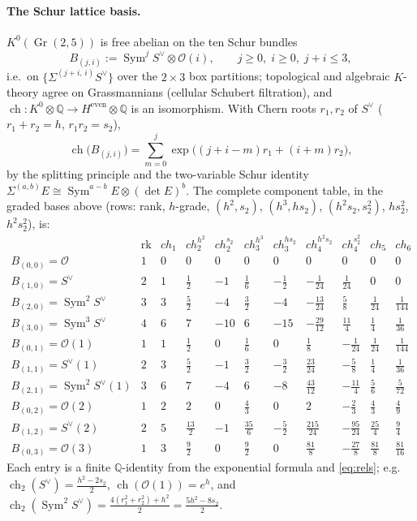\documentclass[11pt]{article}
\theoremstyle{definition}
\newcommand{\ch}{\operatorname{ch}}
\newcommand{\Gr}{\operatorname{Gr}}
\newcommand{\Sym}{\operatorname{Sym}}
\newcommand{\tensor}{\otimes}
\newcommand{\Oo}{\mathcal O}
\begin{document}
\paragraph{The Schur lattice basis.}
$K^0(\Gr(2,5))$ is free abelian on the ten Schur bundles
\[
B_{(j,i)}:=\Sym^j S^\vee\tensor\Oo(i),
\qquad j\ge 0,\; i\ge 0,\; j+i\le 3,
\]
i.e.\ on $\{\Sigma^{(j+i,\,i)}S^\vee\}$ over the $2\times3$ box
partitions; topological and algebraic $K$-theory agree on
Grassmannians (cellular Schubert filtration), and
$\ch:K^0\tensor\mathbb Q\to H^{\mathrm{even}}\tensor\mathbb Q$ is an
isomorphism. With Chern roots $r_1,r_2$ of $S^\vee$
($r_1+r_2=h$, $r_1r_2=s_2$),
\[
\ch\bigl(B_{(j,i)}\bigr)=\sum_{m=0}^{j}
\exp\bigl((j+i-m)r_1+(i+m)r_2\bigr),
\]
by the splitting principle and the two-variable Schur identity
$\Sigma^{(a,b)}E\cong\Sym^{a-b}E\tensor(\det E)^b$. The complete
component table, in the graded bases above (rows: rank, $h$-grade,
$(h^2,s_2)$, $(h^3,hs_2)$, $(h^2s_2,s_2^2)$, $hs_2^2$, $h^2s_2^2$), is:
\[
\begin{array}{c|cccccccccc}
 & \text{rk} & ch_1 & ch_2^{h^2} & ch_2^{s_2} & ch_3^{h^3} & ch_3^{hs_2}
 & ch_4^{h^2s_2} & ch_4^{s_2^2} & ch_5 & ch_6\\ \hline
B_{(0,0)}=\Oo & 1&0&0&0&0&0&0&0&0&0\\
B_{(1,0)}=S^\vee & 2&1&\tfrac12&-1&\tfrac16&-\tfrac12&-\tfrac1{24}
&\tfrac1{24}&0&0\\
B_{(2,0)}=\Sym^2S^\vee & 3&3&\tfrac52&-4&\tfrac32&-4&-\tfrac{13}{24}
&\tfrac58&\tfrac1{24}&\tfrac1{144}\\
B_{(3,0)}=\Sym^3S^\vee & 4&6&7&-10&6&-15&-\tfrac{29}{12}&\tfrac{11}4
&\tfrac14&\tfrac1{36}\\
B_{(0,1)}=\Oo(1) & 1&1&\tfrac12&0&\tfrac16&0&\tfrac18&-\tfrac1{24}
&\tfrac1{24}&\tfrac1{144}\\
B_{(1,1)}=S^\vee(1) & 2&3&\tfrac52&-1&\tfrac32&-\tfrac32
&\tfrac{23}{24}&-\tfrac58&\tfrac14&\tfrac1{36}\\
B_{(2,1)}=\Sym^2S^\vee(1) & 3&6&7&-4&6&-8&\tfrac{43}{12}&-\tfrac{11}4
&\tfrac56&\tfrac5{72}\\
B_{(0,2)}=\Oo(2) & 1&2&2&0&\tfrac43&0&2&-\tfrac23&\tfrac43
&\tfrac49\\
B_{(1,2)}=S^\vee(2) & 2&5&\tfrac{13}2&-1&\tfrac{35}6&-\tfrac52
&\tfrac{215}{24}&-\tfrac{95}{24}&\tfrac{25}4&\tfrac94\\
B_{(0,3)}=\Oo(3) & 1&3&\tfrac92&0&\tfrac92&0&\tfrac{81}8&-\tfrac{27}8
&\tfrac{81}8&\tfrac{81}{16}
\end{array}
\]
Each entry is a finite $\mathbb Q$-identity from the exponential formula
and \eqref{eq:rels}; e.g.\
$\ch_2(S^\vee)=\tfrac{h^2-2s_2}2$,
$\ch(\Oo(1))=e^{h}$, and
$\ch_2(\Sym^2S^\vee)=\tfrac{4(r_1^2+r_2^2)+h^2}{2}
=\tfrac{5h^2-8s_2}{2}$.
\end{document}
